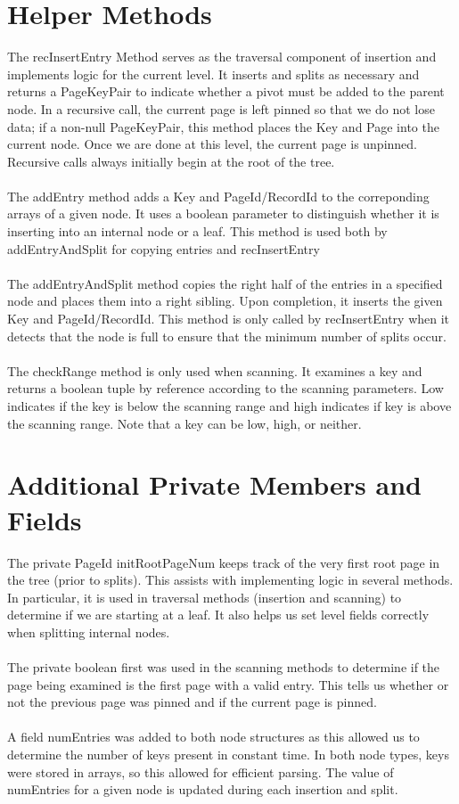 \documentclass{article}
\begin{document}
\section*{Helper Methods}
The recInsertEntry Method serves as the traversal component of insertion and implements logic for the current level. It inserts and splits as necessary and returns a PageKeyPair to indicate whether a pivot must be added to the parent node. In a recursive call, the current page is left pinned so that we do not lose data; if a non-null PageKeyPair, this method places the Key and Page into the current node. Once we are done at this level, the current page is unpinned. Recursive calls always initially begin at the root of the tree.
\\\\
The addEntry method adds a Key and PageId/RecordId to the correponding arrays of a given node. It uses a boolean parameter to distinguish whether it is inserting into an internal node or a leaf. This method is used both by addEntryAndSplit for copying entries and recInsertEntry
\\\\
The addEntryAndSplit method copies the right half of the entries in a specified node and places them into a right sibling. Upon completion, it inserts the given Key and PageId/RecordId. This method is only called by recInsertEntry when it detects that the node is full to ensure that the minimum number of splits occur. 
\\\\
The checkRange method is only used when scanning. It examines a key and returns a boolean tuple by reference according to the scanning parameters. Low indicates if the key is below the scanning range and high indicates if key is above the scanning range. Note that a key can be low, high, or neither.\\
\section*{Additional Private Members and Fields}
The private PageId initRootPageNum keeps track of the very first root page in the tree (prior to splits). This assists with implementing logic in several methods. In particular, it is used in traversal methods (insertion and scanning) to determine if we are starting at a leaf. It also helps us set level fields correctly when splitting internal nodes.
\\\\
The private boolean first was used in the scanning methods to determine if the page being examined is the first page with a valid entry. This tells us whether or not the previous page was pinned and if the current page is pinned.
\\\\
A field numEntries was added to both node structures as this allowed us to determine the number of keys present in constant time. In both node types, keys were stored in arrays, so this allowed for efficient parsing. The value of numEntries for a given node is updated during each insertion and split.\\
\end{document}
